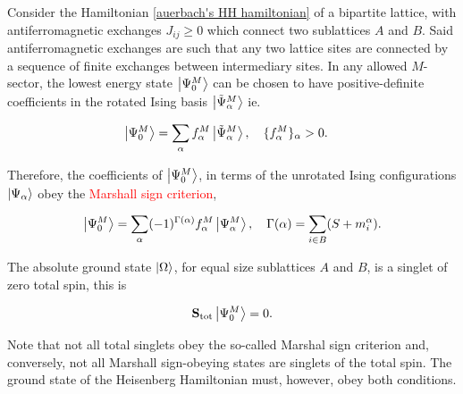 \documentclass{homework}
\begin{document}
\begin{theorem}
    Consider the Hamiltonian \cref{auerbach's HH hamiltonian} of a bipartite lattice, with \textnormal{antiferromagnetic} exchanges $J_{ij} \geq 0$ which connect two sublattices $A$ and $B$. Said antiferromagnetic exchanges are such that any two lattice sites are connected by a sequence of finite exchanges between intermediary sites. In any allowed $M$-sector, the lowest energy state $\ket{\Psi^M_0}$ can be chosen to have positive-definite coefficients in the rotated Ising basis $\ket{\tilde{\Psi}^M_{\alpha}}$ ie.
    
    \begin{align}
        \ket{\Psi^M_0} &= \sum_{\alpha} f_{\alpha}^M \ket{\tilde{\Psi}^M_{\alpha}}, \quad\{f_{\alpha}^M\}_{\alpha} > 0.
    \end{align}
    
    Therefore, the coefficients of $\ket{\Psi^M_0}$, in terms of the unrotated Ising configurations $\ket{\Psi_\alpha}$ obey the \textnormal{\textcolor{red}{{Marshall sign criterion}}},
    
    \begin{equation}
        \ket{\Psi^M_0} = \sum_{\alpha} (-1)^{\Gamma(\alpha)} f_{\alpha}^M \ket{{\Psi}^M_{\alpha}}, \quad \Gamma(\alpha) = \sum_{i \in B} (S + m_i^\alpha).
    \end{equation}
    \label{Marshall_theo_1}
\end{theorem}

\begin{theorem}
The absolute ground state $\ket{\Omega}$, for equal size sublattices $A$ and $B$, is a singlet of zero total spin, this is 

$$
    {{\bf S}}_{\textnormal{tot}} \ket{\Psi^M_0}= 0.
$$
\label{Marshall_theo_2}
\end{theorem}

Note that not all total singlets obey the so-called Marshal sign criterion and, conversely, not all Marshall sign-obeying states are singlets of the total spin. The ground state of the Heisenberg Hamiltonian must, however, obey both conditions. \\
\end{document}
